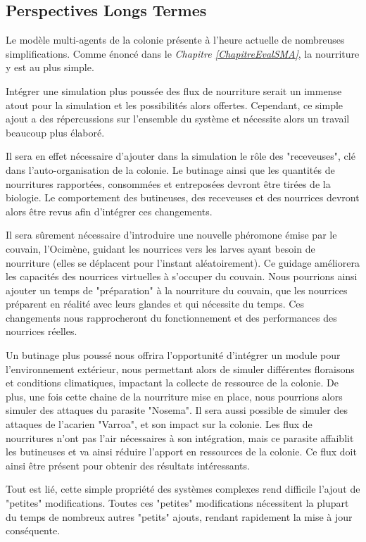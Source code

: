 	\subsection*{Perspectives Longs Termes}
	Le modèle multi-agents de la colonie présente à l'heure actuelle de nombreuses simplifications. Comme énoncé dans le \textit{Chapitre \ref{ChapitreEvalSMA}}, la nourriture y est au plus simple. 
	
	Intégrer une simulation plus poussée des flux de nourriture serait un immense atout pour la simulation et les possibilités alors offertes. Cependant, ce simple ajout a des répercussions sur l'ensemble du système et nécessite alors un travail beaucoup plus élaboré. 
	
	Il sera en effet nécessaire d'ajouter dans la simulation le rôle des "receveuses", clé dans l'auto-organisation de la colonie. Le butinage ainsi que les quantités de nourritures rapportées, consommées et entreposées devront être tirées de la biologie. Le comportement des butineuses, des receveuses et des nourrices devront alors être revus afin d'intégrer ces changements.
	
	Il sera sûrement nécessaire d'introduire une nouvelle phéromone émise par le couvain, l'Ocimène, guidant les nourrices vers les larves ayant besoin de nourriture (elles se déplacent pour l'instant aléatoirement). Ce guidage améliorera les capacités des nourrices virtuelles à s'occuper du couvain. Nous pourrions ainsi ajouter un temps de "préparation" à la nourriture du couvain, que les nourrices préparent en réalité avec leurs glandes et qui nécessite du temps. Ces changements nous rapprocheront du fonctionnement et des performances des nourrices réelles.
	
	Un butinage plus poussé nous offrira l'opportunité d'intégrer un module pour l'environnement extérieur, nous permettant alors de simuler différentes floraisons et conditions climatiques, impactant la collecte de ressource de la colonie. De plus, une fois cette chaine de la nourriture mise en place, nous pourrions alors simuler des attaques du parasite "Nosema". Il sera aussi possible de simuler des attaques de l'acarien "Varroa", et son impact sur la colonie. Les flux de nourritures n'ont pas l'air nécessaires à son intégration, mais ce parasite affaiblit les butineuses et va ainsi réduire l'apport en ressources de la colonie. Ce flux doit ainsi être présent pour obtenir des résultats intéressants.
	
	Tout est lié, cette simple propriété des systèmes complexes rend difficile l'ajout de "petites" modifications. Toutes ces "petites" modifications nécessitent la plupart du temps de nombreux autres "petits" ajouts, rendant rapidement la mise à jour conséquente.
	